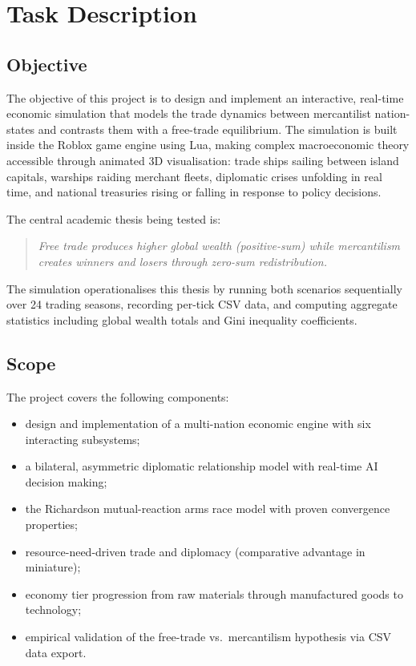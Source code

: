 \documentclass[12pt,a4paper]{article}
\begin{document}
\section{Task Description}

\subsection{Objective}

The objective of this project is to design and implement an interactive, real-time economic simulation that models the trade dynamics between mercantilist nation-states and contrasts them with a free-trade equilibrium. The simulation is built inside the Roblox game engine using Lua, making complex macroeconomic theory accessible through animated 3D visualisation: trade ships sailing between island capitals, warships raiding merchant fleets, diplomatic crises unfolding in real time, and national treasuries rising or falling in response to policy decisions.

The central academic thesis being tested is:

\begin{quote}
\textit{Free trade produces higher global wealth (positive-sum) while mercantilism creates winners and losers through zero-sum redistribution.}
\end{quote}

The simulation operationalises this thesis by running both scenarios sequentially over 24 trading seasons, recording per-tick CSV data, and computing aggregate statistics including global wealth totals and Gini inequality coefficients.

\subsection{Scope}

The project covers the following components:
\begin{itemize}
    \renewcommand{\labelitemi}{--}
    \item design and implementation of a multi-nation economic engine with six interacting subsystems;
    \item a bilateral, asymmetric diplomatic relationship model with real-time AI decision making;
    \item the Richardson mutual-reaction arms race model with proven convergence properties;
    \item resource-need-driven trade and diplomacy (comparative advantage in miniature);
    \item economy tier progression from raw materials through manufactured goods to technology;
    \item empirical validation of the free-trade vs.\ mercantilism hypothesis via CSV data export.
\end{itemize}
\end{document}
